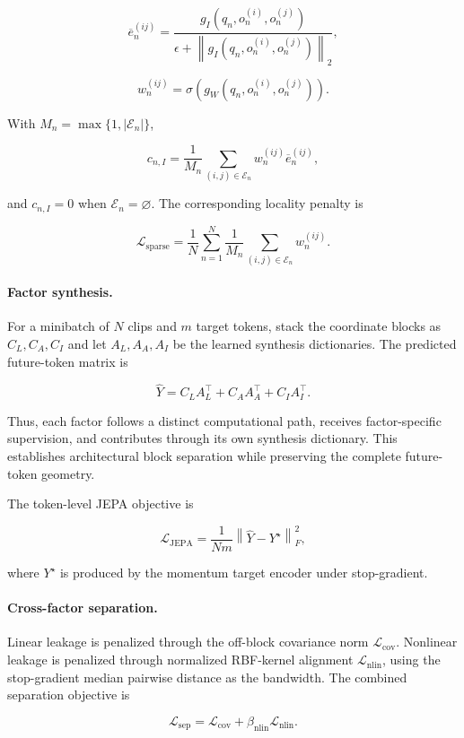 \[
\overline e_n^{(ij)}
=
\frac{
g_I(q_n,o_n^{(i)},o_n^{(j)})
}{
\epsilon+
\left\|
g_I(q_n,o_n^{(i)},o_n^{(j)})
\right\|_2
},
\]

\[
w_n^{(ij)}
=
\sigma
\left(
g_W(q_n,o_n^{(i)},o_n^{(j)})
\right).
\]

With \(M_n=\max\{1,|\mathcal E_n|\}\),

\[
c_{n,I}
=
\frac{1}{M_n}
\sum_{(i,j)\in\mathcal E_n}
w_n^{(ij)}
\overline e_n^{(ij)},
\]

and \(c_{n,I}=0\) when \(\mathcal E_n=\varnothing\). The corresponding
locality penalty is

\[
\mathcal L_{\mathrm{sparse}}
=
\frac{1}{N}
\sum_{n=1}^{N}
\frac{1}{M_n}
\sum_{(i,j)\in\mathcal E_n}
w_n^{(ij)}.
\]

\paragraph{Factor synthesis.}
For a minibatch of \(N\) clips and \(m\) target tokens, stack the
coordinate blocks as \(C_L,C_A,C_I\) and let
\(A_L,A_A,A_I\) be the learned synthesis dictionaries. The predicted
future-token matrix is

\[
\widehat Y
=
C_LA_L^\top
+
C_AA_A^\top
+
C_IA_I^\top .
\]

Thus, each factor follows a distinct computational path, receives
factor-specific supervision, and contributes through its own synthesis
dictionary. This establishes architectural block separation while
preserving the complete future-token geometry.

The token-level JEPA objective is

\[
\mathcal L_{\mathrm{JEPA}}
=
\frac{1}{Nm}
\left\|
\widehat Y-Y^\star
\right\|_F^2,
\]

where \(Y^\star\) is produced by the momentum target encoder under
stop-gradient.

\paragraph{Cross-factor separation.}
Linear leakage is penalized through the off-block covariance norm
\(\mathcal L_{\mathrm{cov}}\). Nonlinear leakage is penalized through
normalized RBF-kernel alignment \(\mathcal L_{\mathrm{nlin}}\), using
the stop-gradient median pairwise distance as the bandwidth. The
combined separation objective is

\[
\mathcal L_{\mathrm{sep}}
=
\mathcal L_{\mathrm{cov}}
+
\beta_{\mathrm{nlin}}
\mathcal L_{\mathrm{nlin}}.
\]

